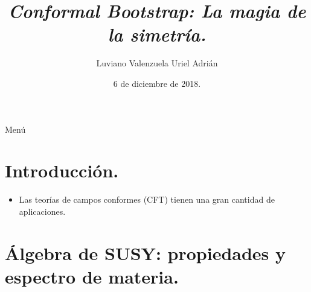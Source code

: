 \documentclass[10pt,a4paper]{beamer}
\begin{document}
\newcommand{\Id}{\mathbb{I}} 
\newcommand{\wf}{\Ket{\psi}} 
\newcommand{\num}{\ensuremath{\hat{n}}}
\newcommand{\Lac}{\ensuremath{\mathbf{\hat{L}^2}}} 
\newcommand{\Lag}{\mathcal{L}} 
\newcommand{\Ham}{\ensuremath{\hat{H}}} 
\newcommand{\Tr}{\mathrm{Tr}} 
\title{
  \it{Conformal Bootstrap:} La magia de la simetría.
}
\author{ 
  Luviano Valenzuela Uriel Adrián}
\date{6 de diciembre de 2018.}
\begin{frame}
\titlepage
\end{frame} 

\begin{frame}{Menú}
\tableofcontents
\end{frame}
\section{Introducción.}
\begin{frame}{\secname}
  \begin{itemize}
    \item Las teorías de campos conformes (CFT) tienen una gran cantidad de
      aplicaciones.

  \end{itemize}
\end{frame}

\section{Álgebra de SUSY: propiedades y espectro de materia.}
\label{sec:susy-alg}
\end{document}

